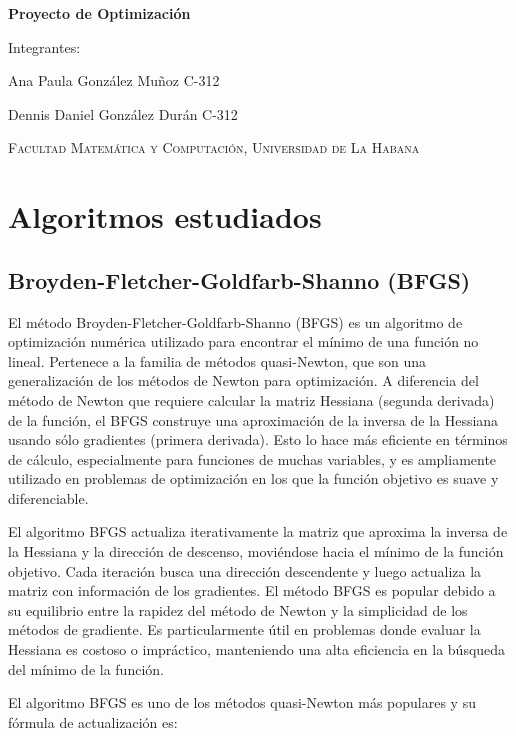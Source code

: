 \documentclass{article}
\begin{document}
\begin{titlepage}
	\centering
	{\bfseries\LARGE Proyecto de Optimización \par}
	\vspace{1cm}
	\vspace{1cm}
	{\LARGE Integrantes: \par}
	{\Large Ana Paula González Muñoz C-312 \par}
	{\Large Dennis Daniel González Durán C-312 \par}
	\vfill
	{\scshape\Large Facultad Matemática y Computación, Universidad de La Habana \par}
\end{titlepage}

\section{Algoritmos estudiados}

\subsection{Broyden-Fletcher-Goldfarb-Shanno (BFGS)}

El método Broyden-Fletcher-Goldfarb-Shanno (BFGS) es un algoritmo de optimización numérica utilizado para encontrar el mínimo de una función no lineal. Pertenece a la familia de métodos quasi-Newton, que son una generalización de los métodos de Newton para optimización. A diferencia del método de Newton que requiere calcular la matriz Hessiana (segunda derivada) de la función, el BFGS construye una aproximación de la inversa de la Hessiana usando sólo gradientes (primera derivada). Esto lo hace más eficiente en términos de cálculo, especialmente para funciones de muchas variables, y es ampliamente utilizado en problemas de optimización en los que la función objetivo es suave y diferenciable.

El algoritmo BFGS actualiza iterativamente la matriz que aproxima la inversa de la Hessiana y la dirección de descenso, moviéndose hacia el mínimo de la función objetivo. Cada iteración busca una dirección descendente y luego actualiza la matriz con información de los gradientes. El método BFGS es popular debido a su equilibrio entre la rapidez del método de Newton y la simplicidad de los métodos de gradiente. Es particularmente útil en problemas donde evaluar la Hessiana es costoso o impráctico, manteniendo una alta eficiencia en la búsqueda del mínimo de la función.


El algoritmo BFGS es uno de los métodos
quasi-Newton más populares y su fórmula de actualización es:
\end{document}
